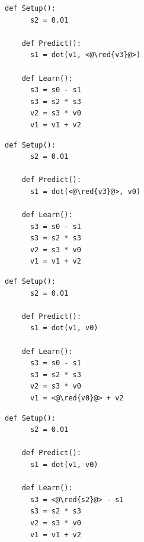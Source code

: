 \documentclass[11pt,oneside,openany,report]{jsbook}
\newcommand{\red}[1]{\textcolor{red}{#1}}
\begin{document}
\begin{multicols}{2}
  \begin{lstlisting}[caption=妥当なアルゴリズムの条件2の(a)を満たさない非妥当なアルゴリズム,label=code:invalid_algorithm_2]
    def Setup():
      s2 = 0.01

    def Predict():
      s1 = dot(v1, <@\red{v3}@>)

    def Learn():
      s3 = s0 - s1
      s3 = s2 * s3
      v2 = s3 * v0
      v1 = v1 + v2
  \end{lstlisting}

  \columnbreak

  \begin{lstlisting}[caption=妥当なアルゴリズムの条件2の(b)を満たさない非妥当なアルゴリズム,label=code:invalid_algorithm_3]
    def Setup():
      s2 = 0.01

    def Predict():
      s1 = dot(<@\red{v3}@>, v0)

    def Learn():
      s3 = s0 - s1
      s3 = s2 * s3
      v2 = s3 * v0
      v1 = v1 + v2
  \end{lstlisting}
\end{multicols}

\newpage

\begin{multicols}{2}
  \begin{lstlisting}[caption=妥当なアルゴリズムの条件1の(a)を満たさない非妥当なアルゴリズム,label=code:invalid_algorithm_4]
    def Setup():
      s2 = 0.01

    def Predict():
      s1 = dot(v1, v0)

    def Learn():
      s3 = s0 - s1
      s3 = s2 * s3
      v2 = s3 * v0
      v1 = <@\red{v0}@> + v2
  \end{lstlisting}

  \columnbreak

  \begin{lstlisting}[caption=妥当なアルゴリズムの条件1の(b)を満たさない非妥当なアルゴリズム,label=code:invalid_algorithm_5]
    def Setup():
      s2 = 0.01

    def Predict():
      s1 = dot(v1, v0)

    def Learn():
      s3 = <@\red{s2}@> - s1
      s3 = s2 * s3
      v2 = s3 * v0
      v1 = v1 + v2
  \end{lstlisting}
\end{multicols}
\end{document}
